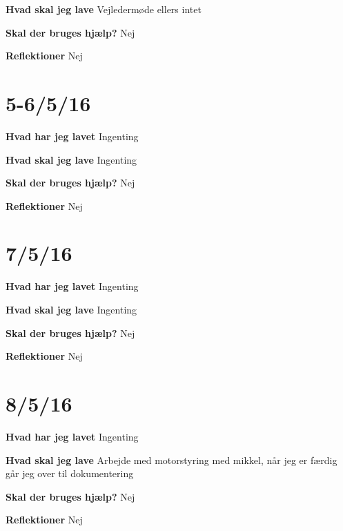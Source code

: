 \documentclass{article}
\begin{document}
	\textbf{Hvad skal jeg lave}
	Vejledermøde ellers intet
	
	\textbf{Skal der bruges hjælp?}
	Nej
	
	
	\textbf{Reflektioner}
	Nej
	
	\section{5-6/5/16}
	\textbf{Hvad har jeg lavet}
	Ingenting
	
	\textbf{Hvad skal jeg lave}
	Ingenting
	
	\textbf{Skal der bruges hjælp?}
	Nej
	
	
	\textbf{Reflektioner}
	Nej
	
	\section{7/5/16}
	\textbf{Hvad har jeg lavet}
	Ingenting
	
	\textbf{Hvad skal jeg lave}
	Ingenting
	
	\textbf{Skal der bruges hjælp?}
	Nej
	
	
	\textbf{Reflektioner}
	Nej
	
	\section{8/5/16}
	\textbf{Hvad har jeg lavet}
	Ingenting
	
	\textbf{Hvad skal jeg lave}
	Arbejde med motorstyring med mikkel, når jeg er færdig går jeg over til dokumentering
	
	\textbf{Skal der bruges hjælp?}
	Nej
	
	
	\textbf{Reflektioner}
	Nej
	
\end{document}
